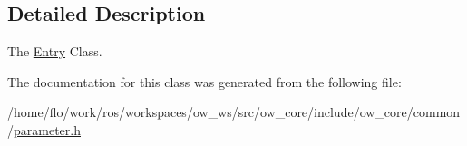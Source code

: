 \subsection{Detailed Description}
The \hyperlink{classow_1_1Entry}{Entry} Class. 

The documentation for this class was generated from the following file\+:\begin{DoxyCompactItemize}
\item 
/home/flo/work/ros/workspaces/ow\+\_\+ws/src/ow\+\_\+core/include/ow\+\_\+core/common/\hyperlink{parameter_8h}{parameter.\+h}\end{DoxyCompactItemize}
